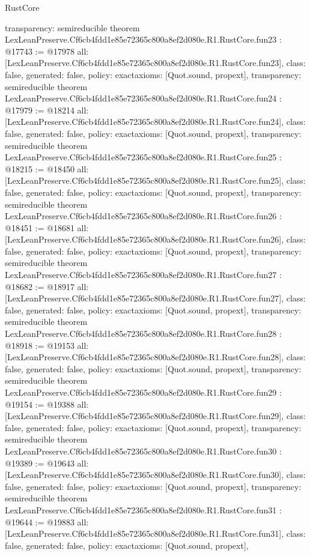 \begin{lexlean}{RustCore}
\begin{coremodule}
{  transparency: semireducible
}
theorem LexLeanPreserve.Cf6cb4fdd1e85e72365c800a8ef2d080e.R1.RustCore.fun23 : @17743 := @17978 {
  all: [LexLeanPreserve.Cf6cb4fdd1e85e72365c800a8ef2d080e.R1.RustCore.fun23],
  class: false,
  generated: false,
  policy: exact{axioms: [Quot.sound, propext]},
  transparency: semireducible
}
theorem LexLeanPreserve.Cf6cb4fdd1e85e72365c800a8ef2d080e.R1.RustCore.fun24 : @17979 := @18214 {
  all: [LexLeanPreserve.Cf6cb4fdd1e85e72365c800a8ef2d080e.R1.RustCore.fun24],
  class: false,
  generated: false,
  policy: exact{axioms: [Quot.sound, propext]},
  transparency: semireducible
}
theorem LexLeanPreserve.Cf6cb4fdd1e85e72365c800a8ef2d080e.R1.RustCore.fun25 : @18215 := @18450 {
  all: [LexLeanPreserve.Cf6cb4fdd1e85e72365c800a8ef2d080e.R1.RustCore.fun25],
  class: false,
  generated: false,
  policy: exact{axioms: [Quot.sound, propext]},
  transparency: semireducible
}
theorem LexLeanPreserve.Cf6cb4fdd1e85e72365c800a8ef2d080e.R1.RustCore.fun26 : @18451 := @18681 {
  all: [LexLeanPreserve.Cf6cb4fdd1e85e72365c800a8ef2d080e.R1.RustCore.fun26],
  class: false,
  generated: false,
  policy: exact{axioms: [Quot.sound, propext]},
  transparency: semireducible
}
theorem LexLeanPreserve.Cf6cb4fdd1e85e72365c800a8ef2d080e.R1.RustCore.fun27 : @18682 := @18917 {
  all: [LexLeanPreserve.Cf6cb4fdd1e85e72365c800a8ef2d080e.R1.RustCore.fun27],
  class: false,
  generated: false,
  policy: exact{axioms: [Quot.sound, propext]},
  transparency: semireducible
}
theorem LexLeanPreserve.Cf6cb4fdd1e85e72365c800a8ef2d080e.R1.RustCore.fun28 : @18918 := @19153 {
  all: [LexLeanPreserve.Cf6cb4fdd1e85e72365c800a8ef2d080e.R1.RustCore.fun28],
  class: false,
  generated: false,
  policy: exact{axioms: [Quot.sound, propext]},
  transparency: semireducible
}
theorem LexLeanPreserve.Cf6cb4fdd1e85e72365c800a8ef2d080e.R1.RustCore.fun29 : @19154 := @19388 {
  all: [LexLeanPreserve.Cf6cb4fdd1e85e72365c800a8ef2d080e.R1.RustCore.fun29],
  class: false,
  generated: false,
  policy: exact{axioms: [Quot.sound, propext]},
  transparency: semireducible
}
theorem LexLeanPreserve.Cf6cb4fdd1e85e72365c800a8ef2d080e.R1.RustCore.fun30 : @19389 := @19643 {
  all: [LexLeanPreserve.Cf6cb4fdd1e85e72365c800a8ef2d080e.R1.RustCore.fun30],
  class: false,
  generated: false,
  policy: exact{axioms: [Quot.sound, propext]},
  transparency: semireducible
}
theorem LexLeanPreserve.Cf6cb4fdd1e85e72365c800a8ef2d080e.R1.RustCore.fun31 : @19644 := @19883 {
  all: [LexLeanPreserve.Cf6cb4fdd1e85e72365c800a8ef2d080e.R1.RustCore.fun31],
  class: false,
  generated: false,
  policy: exact{axioms: [Quot.sound, propext]},
}
\end{coremodule}
\end{lexlean}
